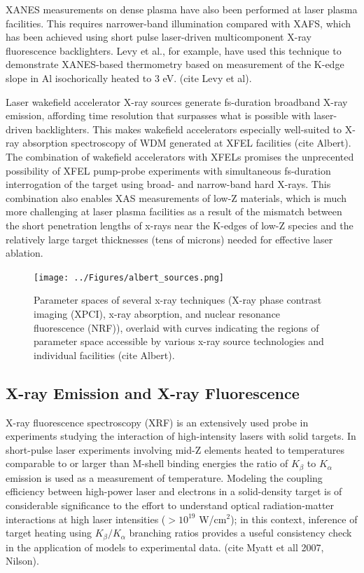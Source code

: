 \documentclass [11pt, proquest, article] {uwthesis}[2016/11/22]
\begin{document}
XANES measurements on dense plasma have also been performed at laser plasma facilities. This requires narrower-band illumination compared with XAFS, which has been achieved using short pulse laser-driven multicomponent X-ray fluorescence backlighters. Levy et al., for example, have used this technique to demonstrate XANES-based thermometry based on measurement of the K-edge slope in Al isochorically heated to 3 eV. (cite Levy et al).

Laser wakefield accelerator X-ray sources generate fs-duration broadband X-ray emission, affording time resolution that surpasses what is possible with laser-driven backlighters. This makes wakefield accelerators especially well-suited to X-ray absorption spectroscopy of WDM generated at XFEL facilities (cite Albert). The combination of wakefield accelerators with XFELs promises the unprecented possibility of XFEL pump-probe experiments with simultaneous fs-duration interrogation of the target using broad- and narrow-band hard X-rays. This combination also enables XAS measurements of low-Z materials, which is much more challenging at laser plasma facilities as a result of the mismatch between the short penetration lengths of x-rays near the K-edges of low-Z species and the relatively large target thicknesses (tens of microns) needed for effective laser ablation. 

\begin{figure}[h] \label{albert_sources}
\caption{Parameter spaces of several x-ray techniques (X-ray phase contrast imaging (XPCI), x-ray absorption, and nuclear resonance fluorescence (NRF)), overlaid with curves indicating the regions of parameter space accessible by various x-ray source technologies and individual facilities (cite Albert).}
\centering
\texttt{[image: ../Figures/albert\_sources.png]}
\end{figure}


\subsection{X-ray Emission and X-ray Fluorescence}
X-ray fluorescence spectroscopy (XRF) is an extensively used probe in experiments studying the interaction of high-intensity lasers with solid targets. In short-pulse laser experiments involving mid-Z elements heated to temperatures comparable to or larger than M-shell binding energies the ratio of $K_\beta$ to $K_\alpha$ emission is used as a measurement of temperature. Modeling the coupling efficiency between high-power laser and electrons in a solid-density target is of considerable significance to the effort to understand optical radiation-matter interactions at high laser intensities ($> 10^{19}$ W/cm$^2$); in this context, inference of target heating using $K_\beta/K_\alpha$ branching ratios provides a useful consistency check in the application of models to experimental data. (cite Myatt et all 2007, Nilson).
\end{document}
